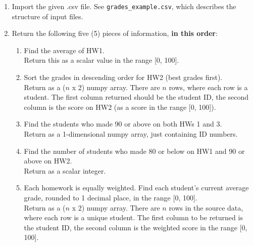 \documentclass[11pt,oneside]{article}
\begin{document}
\begin{enumerate}

\item Import the given .csv file.  See \texttt{grades\_example.csv}, which describes the structure of input files.

\item Return the following five (5) pieces of information, \textbf{in this order}:

	\begin{enumerate}
		\item Find the average of HW1. \\
			Return this as a scalar value in the range [0, 100].

		\item Sort the grades in descending order for HW2 (best grades first). \\
			Return as a ($n$ x 2) numpy array.  There are $n$ rows, where each row is a student.  The first column returned should be the student ID, the second column is the score on HW2 (as a score in the range [0, 100]).
	
		\item Find the students who made 90 or above on both HWs 1 and 3. \\
			Return as a 1-dimensional numpy array, just containing ID numbers.

		\item Find the number of students who made 80 or below on HW1 and 90 or above on HW2. \\
			Return as a scalar integer.
	
		\item Each homework is equally weighted.  Find each student's current average grade, rounded to 1 decimal place, in the range [0, 100]. \\
			Return as a ($n$ x 2) numpy array.  There are $n$ rows in the source data, where each row is a unique student.  The first column to be returned is the student ID, the second column is the weighted score in the range [0, 100].
	
	
	\end{enumerate}
\end{enumerate}
		

	
\end{document}
